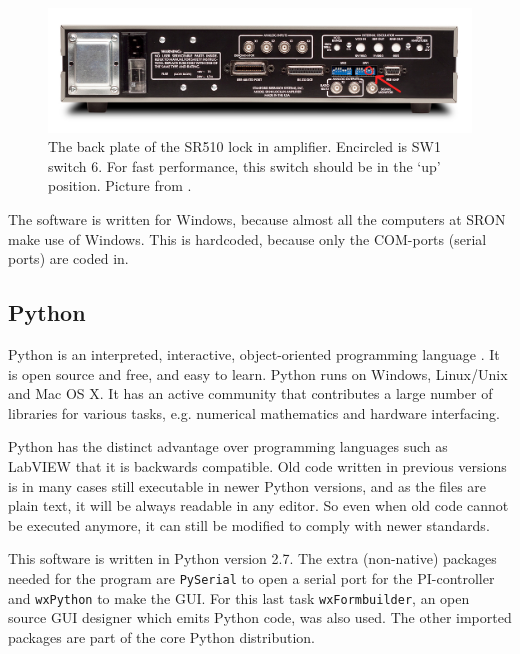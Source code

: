 \begin{figure}[h!tb]
 \begin{center}
  \includegraphics[width=\textwidth]{figures/SR510_Rear_circle.jpg}
  \caption{The back plate of the SR510 lock in amplifier. Encircled is SW1 switch 6. For fast performance, this switch should be in the `up' position. Picture from \cite{SR}.}
  \label{fig:SR510_back}
 \end{center}
\end{figure}


The software is written for Windows, because almost all the computers at SRON make use of Windows. This is hardcoded, because only the COM-ports (serial ports) are coded in.

\subsection{Python}
Python is an interpreted, interactive, object-oriented programming language \cite{python}. It is open source and free, and easy to learn. Python runs on Windows, Linux/Unix and Mac OS X. It has an active community that contributes a large number of libraries for various tasks, e.g. numerical mathematics and hardware interfacing.

Python has the distinct advantage over programming languages such as LabVIEW that it is backwards compatible. Old code written in previous versions is in many cases still executable in newer Python versions, and as the files are plain text, it will be always readable in any editor. So even when old code cannot be executed anymore, it can still be modified to comply with newer standards.

This software is written in Python version 2.7. The extra (non-native) packages needed for the program are \verb!PySerial! to open a serial port for the PI-controller and \verb!wxPython! to make the GUI. For this last task \verb!wxFormbuilder!, an open source GUI designer which emits Python code, was also used. The other imported packages are part of the core Python distribution.
